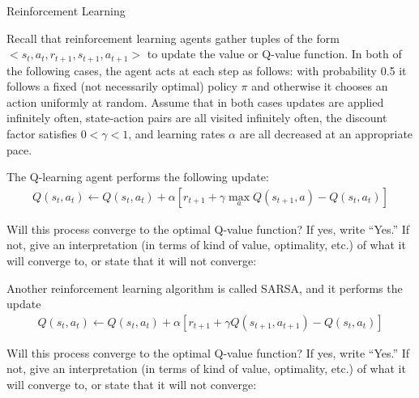 \begin{problem}[]{Reinforcement Learning}

Recall that reinforcement learning agents gather tuples of the form $<s_t, a_t, r_{t+1}, s_{t+1}, a_{t+1}>$ to update the value or Q-value function.
In both of the following cases, the agent acts at each step as follows: with probability 0.5 it follows a fixed (not necessarily optimal) policy $\pi$ and otherwise it chooses an action uniformly at random.  Assume that in both cases updates are applied infinitely often, state-action pairs are all visited infinitely often, the discount factor satisfies $0 < \gamma < 1$, and learning rates $\alpha$ are all decreased at an appropriate pace.

\begin{question}[4] The Q-learning agent performs the following update:
\begin{align*}
Q(s_t, a_t) \leftarrow Q(s_t, a_t) + \alpha [r_{t+1} + \gamma \max_a Q(s_{t+1}, a) - Q(s_t, a_t)]
\end{align*}

Will this process converge to the optimal Q-value function?
If yes, write ``Yes.''
If not, give an interpretation (in terms of kind of value, optimality, etc.) of what it will converge to, or state that it will not converge:


\end{question}

\begin{question}[4] Another reinforcement learning algorithm is called SARSA, and it performs the update
\begin{align*}
Q(s_t, a_t) \leftarrow Q(s_t, a_t) + \alpha [r_{t+1} + \gamma Q(s_{t+1}, a_{t+1}) - Q(s_t, a_t)]
\end{align*}

Will this process converge to the optimal Q-value function?
If yes, write ``Yes.''
If not, give an interpretation (in terms of kind of value, optimality, etc.) of what it will converge to, or state that it will not converge:

\end{question}
\end{problem}